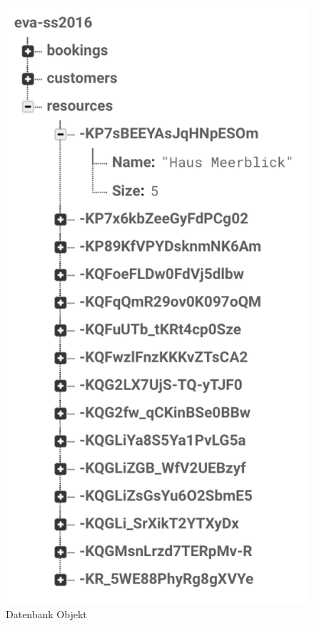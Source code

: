 \begin{figure}[H]
\begin{minipage}[t]{0.32\linewidth}
        \includegraphics[width=\linewidth]{images/backend_database_resource.png}
        \caption{Datenbank Objekt}
        \label{backend_database_resource}
    \end{minipage}
\end{figure}

